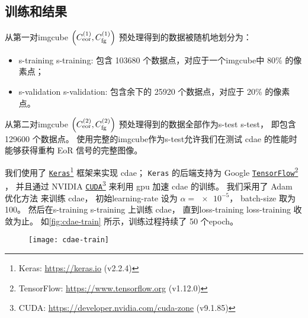 \subsection{训练和结果}
\label{sec:cdae-results}

从第一对\ac{imgcube}
$\left( C_{\mathrm{eor}}^{(1)}, C_{\mathrm{fg}}^{(1)} \right)$
预处理得到的数据被随机地划分为：
\begin{itemize}
  \item \acl{s-training} \ac{s-training}:
    包含 \num{103680} 个数据点，对应于一个\ac{imgcube}中 80\% 的像素点；
  \item \acl{s-validation} \ac{s-validation}:
    包含余下的 \num{25920} 个数据点，对应于 20\% 的像素点。
\end{itemize}
从第二对\ac{imgcube}
$\left( C_{\mathrm{eor}}^{(2)}, C_{\mathrm{fg}}^{(2)} \right)$
预处理得到的数据全部作为\acl{s-test} \ac{s-test}，
即包含 \num{129600} 个数据点。
使用完整的\ac{imgcube}作为\acl{s-test}允许我们在测试 \ac{cdae}
的性能时能够获得重构 EoR 信号的完整图像。

我们使用了 \href{https://keras.io}{\texttt{Keras}}\footnote{%
  Keras: \url{https://keras.io} (v2.2.4)}
框架\cite{keras}来实现 \ac{cdae}；
\texttt{Keras} 的后端支持为 Google
\href{https://www.tensorflow.org}{\texttt{TensorFlow}}\footnote{%
  TensorFlow: \url{https://www.tensorflow.org} (v1.12.0)}
\cite{tensorflow}，
并且通过 NVIDIA
\href{https://developer.nvidia.com/cuda-zone}{\texttt{CUDA}}\footnote{%
  CUDA: \url{https://developer.nvidia.com/cuda-zone} (v9.1.85)}
来利用 \ac{gpu} 加速 \ac{cdae} 的训练。
我们采用了 Adam 优化方法\cite{kingma2015} 来训练 \ac{cdae}，
初始\ac{learning-rate} 设为 $\alpha = \num{e-5}$，
\ac{batch-size} 取为 100。
然后在\acl{s-training} \ac{s-training} 上训练 \ac{cdae}，
直到\acl{loss-training} \ac{loss-training} 收敛为止。
如\autoref{fig:cdae-train} 所示，训练过程持续了 50 个\ac{epoch}。

\begin{figure}[htp]
  \centering
  \texttt{[image: cdae-train]}
  \label{fig:cdae-train}
\end{figure}

